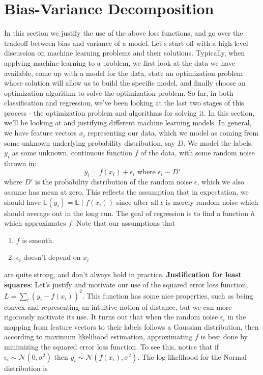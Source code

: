 \documentclass{article}
\begin{document}
\section{Bias-Variance Decomposition}
In this section we justify the use of the above loss functions, and go over the tradeoff between bias and variance of a model. Let's start off with a high-level discussion on machine learning problems and their solutions. Typically, when applying machine learning to a problem, we first look at the data we have available, come up with a model for the data, state an optimization problem whose solution will allow us to build the specific model, and finally choose an optimization algorithm to solve the optimization problem. So far, in both classification and regression, we've been looking at the last two stages of this process - the optimization problem and algorithms for solving it. In this section, we'll be looking at and justifying different machine learning models.
\newline
In general, we have feature vectors $ x_i $ representing our data, which we model as coming from some unknown underlying probability distribution, say $ D $. We model the labels, $ y_i $ as some unknown, continuous function $ f $ of the data, with some random noise thrown in:
$$ y_i = f(x_i) + \epsilon_i \text{ where } \epsilon_i \sim D' $$
where $ D' $ is the probability distribution of the random noise $ \epsilon $, which we also assume has mean at zero. This reflects the assumption that in expectation, we should have $ \mathbb{E}(y_i) = \mathbb{E}(f(x_i)) $ since after all $ \epsilon $ is merely random noise which should average out in the long run. The goal of regression is to find a function $ h $ which approximates $ f $. Note that our assumptions that
\begin{enumerate}
    \item $ f $ is smooth.
    \item $ \epsilon_i $ doesn't depend on $ x_i $
\end{enumerate}
are quite strong, and don't always hold in practice.
\newline \newline
\textbf{Justification for least squares}: Let's justify and motivate our use of the squared error loss function, $ L = \sum_i (y_i - f(x_i))^2 $. This function has some nice properties, such as being convex and representing an intuitive notion of distance, but we can more rigorously motivate its use. It turns out that when the random noise $ \epsilon_i $ in the mapping from feature vectors to their labels follows a Gaussian distribution, then according to maximum likelihood estimation, approximating $ f $ is best done by minimizing the squared error loss function. To see this, notice that if $ \epsilon_i \sim \mathcal{N}(0, \sigma^2) $ then $ y_i \sim \mathcal{N}(f(x_i), \sigma^2) $. The log-likelihood for the Normal distribution is
\end{document}
